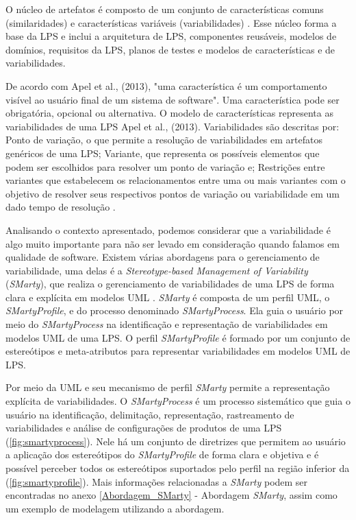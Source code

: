 O núcleo de artefatos é composto de um conjunto de características comuns (similaridades) e características variáveis (variabilidades) \cite{linden2007product}. Esse núcleo forma a base da LPS e inclui a arquitetura de LPS, componentes reusáveis, modelos de domínios, requisitos da LPS, planos de testes e modelos de características e de variabilidades.

De acordo com Apel et al., (2013), "uma característica  é um
comportamento visível ao usuário final de um sistema de software". Uma característica pode ser obrigatória, opcional ou alternativa. O modelo de características representa as variabilidades de uma LPS Apel et al., (2013). Variabilidades são descritas por: Ponto de variação, o que permite a resolução de variabilidades em artefatos genéricos de uma LPS; Variante, que representa os possíveis elementos que podem ser escolhidos para resolver um ponto de variação e; Restrições entre variantes que estabelecem os relacionamentos entre uma ou mais variantes com o objetivo de resolver seus respectivos pontos de variação ou variabilidade em um dado tempo de resolução \cite{linden2007product,pohl2005software,apel2016feature}.

Analisando o contexto apresentado, podemos considerar que a variabilidade é algo muito importante para não ser levado em consideração quando falamos em qualidade de software. Existem várias abordagens para o gerenciamento de variabilidade, uma delas é a \textit{Stereotype-based Management of Variability} (\textit{SMarty}), que realiza o gerenciamento de variabilidades de uma LPS de forma clara e explícita em modelos UML \cite{junior2010systematic}. \textit{SMarty} é composta de um perfil UML, o \textit{SMartyProfile}, e do processo denominado \textit{SMartyProcess}. Ela guia o usuário por meio do \textit{SMartyProcess} na identificação e representação de variabilidades em modelos UML de uma LPS. O perfil \textit{SMartyProfile} é formado por um conjunto de estereótipos e meta-atributos para representar variabilidades em modelos UML de LPS.

Por meio da UML e seu mecanismo de perfil \textit{SMarty} permite a representação explícita de variabilidades. O \textit{SMartyProcess} é um processo sistemático que guia o usuário na identificação, delimitação, representação, rastreamento de variabilidades e análise de configurações de produtos de uma LPS (\ref{fig:smartyprocess}). Nele há um conjunto de diretrizes que permitem ao usuário a aplicação dos estereótipos do \textit{SMartyProfile} de forma clara e objetiva e é possível perceber todos os estereótipos suportados pelo perfil na região inferior da (\ref{fig:smartyprofile}). Mais informações relacionadas a \textit{SMarty} podem ser encontradas no anexo \ref{Abordagem_SMarty} - Abordagem \textit{SMarty}, assim como um exemplo de modelagem utilizando a abordagem.


